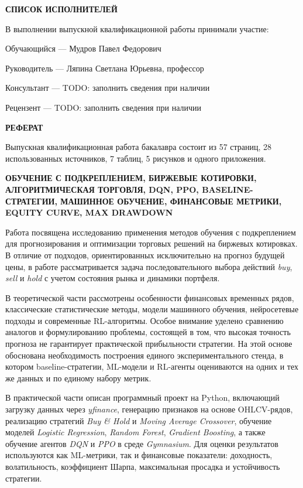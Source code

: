\newpage
\thispagestyle{empty}
\normalsize
\begin{center}
\textbf{СПИСОК ИСПОЛНИТЕЛЕЙ}
\end{center}

\noindent
В выполнении выпускной квалификационной работы принимали участие:

\vspace{0.8em}
\noindent
Обучающийся --- Мудров Павел Федорович

\noindent
Руководитель --- Ляпина Светлана Юрьевна, профессор

\noindent
Консультант --- TODO: заполнить сведения при наличии

\noindent
Рецензент --- TODO: заполнить сведения при наличии

\newpage
\thispagestyle{empty}
\normalsize
\begin{center}
\textbf{РЕФЕРАТ}
\end{center}

\noindent
Выпускная квалификационная работа бакалавра состоит из 57 страниц, 28 использованных источников, 7 таблиц, 5 рисунков и одного приложения.

\vspace{0.5em}
\noindent
\textbf{ОБУЧЕНИЕ С ПОДКРЕПЛЕНИЕМ, БИРЖЕВЫЕ КОТИРОВКИ, АЛГОРИТМИЧЕСКАЯ ТОРГОВЛЯ, DQN, PPO, BASELINE-СТРАТЕГИИ, МАШИННОЕ ОБУЧЕНИЕ, ФИНАНСОВЫЕ МЕТРИКИ, EQUITY CURVE, MAX DRAWDOWN}

\vspace{0.5em}
\noindent
Работа посвящена исследованию применения методов обучения с подкреплением для прогнозирования и оптимизации торговых решений на биржевых котировках. В отличие от подходов, ориентированных исключительно на прогноз будущей цены, в работе рассматривается задача последовательного выбора действий \textit{buy}, \textit{sell} и \textit{hold} с учетом состояния рынка и динамики портфеля.

\noindent
В теоретической части рассмотрены особенности финансовых временных рядов, классические статистические методы, модели машинного обучения, нейросетевые подходы и современные RL-алгоритмы. Особое внимание уделено сравнению аналогов и формулированию проблемы, состоящей в том, что высокая точность прогноза не гарантирует практической прибыльности стратегии. На этой основе обоснована необходимость построения единого экспериментального стенда, в котором baseline-стратегии, ML-модели и RL-агенты оцениваются на одних и тех же данных и по единому набору метрик.

\noindent
В практической части описан программный проект на Python, включающий загрузку данных через \textit{yfinance}, генерацию признаков на основе OHLCV-рядов, реализацию стратегий \textit{Buy \& Hold} и \textit{Moving Average Crossover}, обучение моделей \textit{Logistic Regression}, \textit{Random Forest}, \textit{Gradient Boosting}, а также обучение агентов \textit{DQN} и \textit{PPO} в среде \textit{Gymnasium}. Для оценки результатов используются как ML-метрики, так и финансовые показатели: доходность, волатильность, коэффициент Шарпа, максимальная просадка и устойчивость стратегии.

